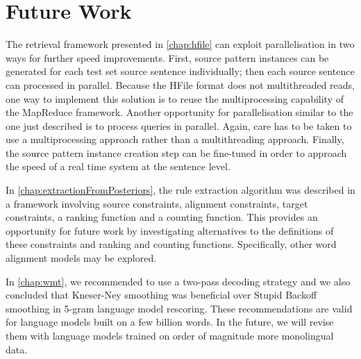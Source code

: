\section{Future Work}
\label{sec:thesisFutureWork}


The retrieval framework presented in \autoref{chap:hfile}
can exploit parallelisation in two ways for further
speed improvements. First, source pattern instances
can be generated for each test set source sentence individually; then
each source sentence can processed in parallel. Because
the HFile format does not multithreaded reads, %
one way to implement this solution is to reuse the multiprocessing
capability of the MapReduce framework.
Another opportunity for parallelisation similar to the one just described
is to process queries in parallel. Again, care has to be taken to use
a multiprocessing approach rather than a multithreading approach.
Finally, the source pattern instance creation step can be fine-tuned
in order to approach the speed of a real time system at the sentence
level.


In \autoref{chap:extractionFromPosteriors}, the rule extraction
algorithm was described in a framework involving
source constraints, alignment constraints, target constraints, a ranking
function and a counting function. This provides an opportunity
for future work by investigating alternatives to the definitions
of these constraints and ranking and counting functions.
Specifically, other word alignment models may be explored.


In \autoref{chap:wmt}, we recommended to use a two-pass
decoding strategy and we also concluded that Kneser-Ney
smoothing was beneficial over Stupid Backoff smoothing
in 5-gram language model rescoring. These recommendations
are valid for language models built on a few billion words.
In the future, we will revise them with language models
trained on order of magnitude more monolingual data.


